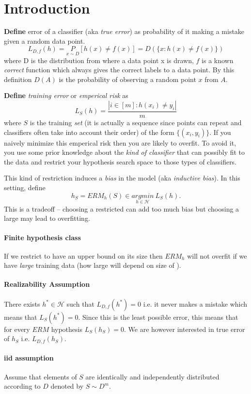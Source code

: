 \section{Introduction}
\textbf{Define} error of a classifier (aka \textit{true error}) as probability of it making a mistake given a random data point.
\[
    L_{D,f}(h) = \underset{x \sim D}P[h(x) \neq f(x)] = D(\{x: h(x) \neq f(x)\})
\]
where D is the distribution from where a data point x is drawn, $f$ is a known \textit{correct} function which always gives the correct labels to a data point. By this definition $D(A)$ is the probability of observing a random point $x$ from $A$.

\textbf{Define} \textit{training error} or \textit{emperical risk} as 
\[
    L_S(h) = \frac{|i \in [m]: h(x_i) \neq y_i|}{m}
\]
where $S$ is the training \textit{set} (it is actually a sequence since points can repeat and classifiers often take into account their order) of the form $\{(x_i, y_i)\}$. If you naively minimize this emperical risk then you are likely to overfit. To avoid it, you use some prior knowledge about the \textit{kind of classifier} that can possibly fit to the data and restrict your hypothesis search space to those types of classifiers.


This kind of restriction induces a \textit{bias} in the model (aka \textit{inductive bias}). In this setting, define 
\[
    h_S = ERM_h(S) \in \underset{h \in \mathcal{H}}{argmin}~L_S(h).
\]
This is a tradeoff -- choosing a restricted  can add too much bias but choosing a large  may lead to overfitting.

\paragraph{Finite hypothesis class} If we restrict  to have an upper bound on its size then $ERM_h$ will not overfit if we have \textit{large} training data (how large will depend on size of ).

\paragraph{Realizability Assumption} There exists $h^* \in \mathcal{H}$ such that $L_{D,f}(h^*) = 0$ i.e. it never makes a mistake which means that $L_S(h^*) = 0$. Since this is the least possible error, this means that for every $ERM$ hypothesis $L_S(h_S) = 0$. We are however interested in true error of $h_S$ i.e. $L_{D,f}(h_S)$.

\paragraph{iid assumption} Assume that elements of $S$ are identically and independently distributed according to $D$ denoted by $S \sim D^m$.
